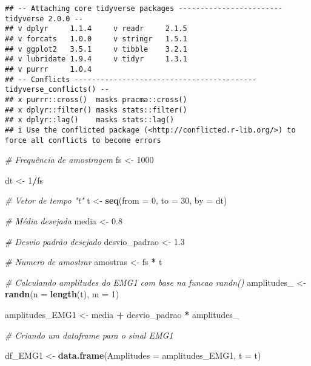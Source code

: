 \documentclass[
]{article}
\newenvironment{Shaded}{\begin{snugshade}}{\end{snugshade}}
\newcommand{\AttributeTok}[1]{\textcolor[rgb]{0.13,0.29,0.53}{#1}}
\newcommand{\CommentTok}[1]{\textcolor[rgb]{0.56,0.35,0.01}{\textit{#1}}}
\newcommand{\DecValTok}[1]{\textcolor[rgb]{0.00,0.00,0.81}{#1}}
\newcommand{\FloatTok}[1]{\textcolor[rgb]{0.00,0.00,0.81}{#1}}
\newcommand{\FunctionTok}[1]{\textcolor[rgb]{0.13,0.29,0.53}{\textbf{#1}}}
\newcommand{\NormalTok}[1]{#1}
\newcommand{\OtherTok}[1]{\textcolor[rgb]{0.56,0.35,0.01}{#1}}
\newcommand{\SpecialCharTok}[1]{\textcolor[rgb]{0.81,0.36,0.00}{\textbf{#1}}}
\begin{document}
\begin{verbatim}
## -- Attaching core tidyverse packages ------------------------ tidyverse 2.0.0 --
## v dplyr     1.1.4     v readr     2.1.5
## v forcats   1.0.0     v stringr   1.5.1
## v ggplot2   3.5.1     v tibble    3.2.1
## v lubridate 1.9.4     v tidyr     1.3.1
## v purrr     1.0.4     
## -- Conflicts ------------------------------------------ tidyverse_conflicts() --
## x purrr::cross()  masks pracma::cross()
## x dplyr::filter() masks stats::filter()
## x dplyr::lag()    masks stats::lag()
## i Use the conflicted package (<http://conflicted.r-lib.org/>) to force all conflicts to become errors
\end{verbatim}

\begin{Shaded}
\begin{Highlighting}[]
\CommentTok{\# Frequência de amostragem}
\NormalTok{fs }\OtherTok{\textless{}{-}} \DecValTok{1000}

\NormalTok{dt }\OtherTok{\textless{}{-}} \DecValTok{1}\SpecialCharTok{/}\NormalTok{fs}

\CommentTok{\# Vetor de tempo "t"}
\NormalTok{t }\OtherTok{\textless{}{-}} \FunctionTok{seq}\NormalTok{(}\AttributeTok{from =} \DecValTok{0}\NormalTok{, }\AttributeTok{to =} \DecValTok{30}\NormalTok{, }\AttributeTok{by =}\NormalTok{ dt)}

\CommentTok{\# Média desejada}
\NormalTok{media }\OtherTok{\textless{}{-}} \FloatTok{0.8}

\CommentTok{\# Desvio padrão desejado}
\NormalTok{desvio\_padrao }\OtherTok{\textless{}{-}} \FloatTok{1.3}

\CommentTok{\# Numero de amostrar}
\NormalTok{amostras }\OtherTok{\textless{}{-}}\NormalTok{ fs }\SpecialCharTok{*}\NormalTok{ t}

\CommentTok{\# Calculando amplitudes do EMG1 com base na funcao randn()}
\NormalTok{amplitudes\_ }\OtherTok{\textless{}{-}} \FunctionTok{randn}\NormalTok{(}\AttributeTok{n =} \FunctionTok{length}\NormalTok{(t), }\AttributeTok{m =} \DecValTok{1}\NormalTok{)}

\NormalTok{amplitudes\_EMG1 }\OtherTok{\textless{}{-}}\NormalTok{ media }\SpecialCharTok{+}\NormalTok{ desvio\_padrao }\SpecialCharTok{*}\NormalTok{ amplitudes\_}

\CommentTok{\# Criando um dataframe para o sinal EMG1}

\NormalTok{df\_EMG1 }\OtherTok{\textless{}{-}} \FunctionTok{data.frame}\NormalTok{(}\AttributeTok{Amplitudes =}\NormalTok{ amplitudes\_EMG1, }\AttributeTok{t =}\NormalTok{ t)}


\end{Highlighting}
\end{Shaded}
\end{document}
